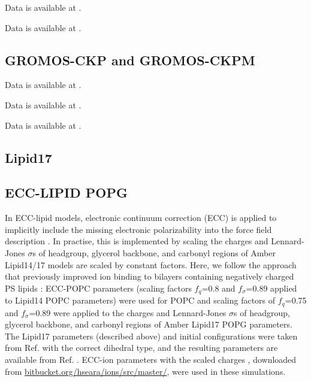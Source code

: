 \documentclass[journal=jpcbfk]{achemso}
\begin{document}
 Data is available at \cite{OPLSuaPOPEfiles}. 

 Data is available at \cite{OPLSuaWvdWPOPEfiles}. 

\subsection{GROMOS-CKP and GROMOS-CKPM}

 Data is available at \cite{gromosCKPpope}. 

 Data is available at \cite{gromosCKPdope}. 

 Data is available at \cite{gromosCKPdppe}. 

\subsection{Lipid17}

\subsection{ECC-LIPID POPG}
In ECC-lipid models, electronic continuum correction (ECC) is applied to 
implicitly include the missing electronic polarizability into the force field description \cite{melcr18,melcr19}.
In practise, this is implemented by scaling the charges and Lennard-Jones $\sigma$s of headgroup, glycerol backbone, and carbonyl regions
of Amber Lipid14/17 models are scaled by constant factors.
Here, we follow the approach that previously improved ion binding to bilayers containing negatively charged PS lipids \cite{melcr19}:
ECC-POPC parameters (scaling factors $f_q$=0.8 and $f_\sigma$=0.89 applied to Lipid14 POPC parameters) \cite{melcr18} were used for POPC
and scaling factors of $f_q$=0.75 and $f_\sigma$=0.89 were applied to the charges and Lennard-Jones $\sigma$s of headgroup, glycerol backbone, and carbonyl regions
of Amber Lipid17 POPG parameters. The Lipid17 parameters (described above) and initial configurations
were taken from Ref. \cite{POPGlipid17} with the correct dihedral type,
and the resulting parameters are available from Ref. . ECC-ion parameters with the scaled charges \cite{pluharova14,kohagen16,martinek18},
downloaded from \url{bitbucket.org/hseara/ions/src/master/}, were used in these simulations. 
\end{document}
